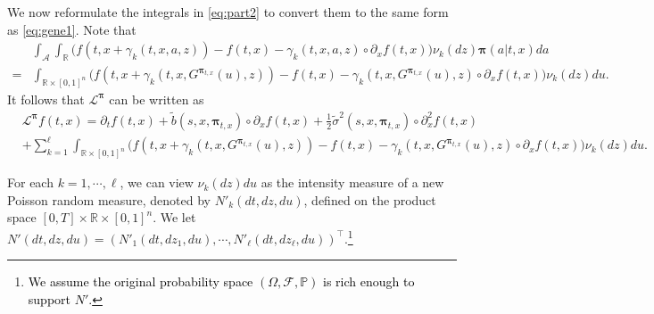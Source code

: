 \documentclass[11pt]{article}
\newcommand{\1}{\mathbbm{1}}
\newcommand{\bpi}{\boldsymbol{\pi}}
\newcommand{\rev}[1]{\textcolor{black}{{#1}}} %
\begin{document}
We now reformulate the integrals in \eqref{eq:part2} to convert them to the same form as \eqref{eq:gene1}. Note that
\begin{align}
	&\int_{\mathcal{A}}\int_{\mathbb{R}} \big( f(t, x+ \gamma_k(t, x ,a, z)) - f(t,x) - \gamma_k(t,x,a,z) \circ  \partial_x f(t,x) \big) \nu_k (dz)\bpi(a | t,x)da\\
	=&\int_{\mathbb{R}\times[0,1]^n} \big( f\left(t, x+ \gamma_k\left(t, x , G^{\bpi_{t,x}}(u), z\right)\right) - f(t,x) - \gamma_k\left(t,x,G^{\bpi_{t,x}}(u),z\right) \circ \partial_x f(t,x) \big) \nu_k (dz)du.
\end{align}
It follows that $\mathcal{L}^{\bpi}$ can be written as
\begin{align}
	&\mathcal{L}^{\bpi}f(t,x)= \partial_t f(t,x) + \tilde{b}(s, x, \bpi_{t,x})\circ\partial_x f(t,x) + \frac{1}{2}\tilde{\sigma}^2(s, x, \bpi_{t,x})\circ\partial_x^2 f(t,x)\\
	&+\sum_{k=1}^\ell\int_{\mathbb{R}\times[0,1]^n} \big(f\left(t, x+ \gamma_k\left(t, x , G^{\bpi_{t,x}}(u), z\right)\right) - f(t,x) - \gamma_k\left(t,x,G^{\bpi_{t,x}}(u),z\right) \circ \partial_x f(t,x) \big) \nu_k (dz)du. \label{eq:expl-gen-2}
\end{align}

For each $k=1,\cdots,\ell$, we can view $\nu_k(dz)du$ as the intensity measure of a new Poisson random measure, denoted by $N'_k(dt,dz,du)$, defined on the product space $[0,T]\times\mathbb{R}\times[0,1]^n$. We let $N'(dt,dz,du)=(N'_1(dt,dz_1,du),\cdots,N'_{\ell}(dt,dz_\ell,du))^\top$.\footnote{\rev{We assume the original probability space $(\Omega,\mathcal{F},\mathbb{P})$ is rich enough to support $N'$.}}


\end{document}
